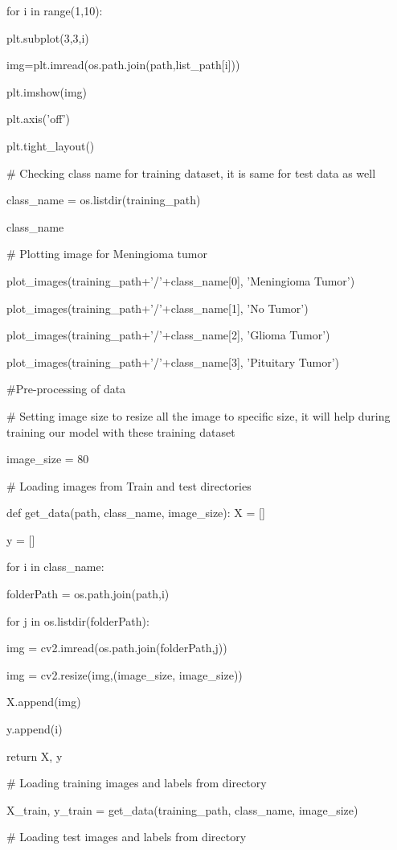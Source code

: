 \documentclass[12pt, a4paper,twoside]{report}
\theoremstyle{plain} %
\theoremstyle{definition} %
\theoremstyle{remark} %
\numberwithin{equation}{chapter}
\begin{document}
  for i in range(1,10):
  
    plt.subplot(3,3,i)
    
    img=plt.imread(os.path.join(path,list\_path[i]))
    
    plt.imshow(img)
    
    plt.axis('off')
    
  plt.tight\_layout()

\# Checking class name for training dataset, it is same for test data as well

class\_name = os.listdir(training\_path)

class\_name

\# Plotting image for Meningioma tumor

plot\_images(training\_path+'/'+class\_name[0], 'Meningioma Tumor')

plot\_images(training\_path+'/'+class\_name[1], 'No Tumor')

plot\_images(training\_path+'/'+class\_name[2], 'Glioma Tumor')

plot\_images(training\_path+'/'+class\_name[3], 'Pituitary Tumor')

\#Pre-processing of data

\# Setting image size to resize all the image to specific size, it will help during training our model with these training dataset

image\_size = 80

\# Loading images from Train and test directories

def get\_data(path, class\_name, image\_size):
  X = []
  
  y = []
  
  for i in class\_name:
  
      folderPath = os.path.join(path,i)
      
      for j in os.listdir(folderPath):
      
          img = cv2.imread(os.path.join(folderPath,j))
          
          img = cv2.resize(img,(image\_size, image\_size))
          
          X.append(img)
          
          y.append(i)
 
  return X, y

\# Loading training images and labels from directory

X\_train, y\_train = get\_data(training\_path, class\_name, image\_size)

\# Loading test images and labels from directory
\end{document}
